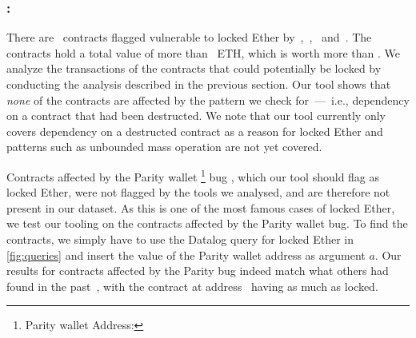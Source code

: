 % 

\subsubsection{\vle: \lockedether}
\label{ssec:analysis-le}
There are~ contracts flagged vulnerable to locked Ether by~\cite{Tsankov2018},~\cite{Grech2018},~\cite{Nikolic2018a} and~\cite{DBLP:conf/ndss/KalraGDS18}. The contracts hold a total value of more than~ ETH, which is worth more than . We analyze the transactions of the contracts that could potentially be locked by conducting the analysis described in the previous section. Our tool shows that \emph{none} of the contracts are affected by the pattern we check for~---~i.e., dependency on a contract that had been destructed.
We note that our tool currently only covers dependency on a destructed contract as a reason for locked Ether and patterns such as unbounded mass operation are not yet covered.

Contracts affected by the Parity wallet \footnote{Parity wallet Address: } bug \cite{Breidenbach}, which our tool should flag as locked Ether, were not flagged by the tools we analysed, and are therefore not present in our dataset.
As this is one of the most famous cases of locked Ether, we test our tooling on the contracts affected by the Parity wallet bug.
To find the contracts, we simply have to use the Datalog query for locked Ether in \autoref{fig:queries} and insert the value of the Parity wallet address as argument $a$. Our results for contracts affected by the Parity bug indeed match what others had found in the past~\cite{parity-wallet-freeze}, with the contract at address~ having as much as  locked.



